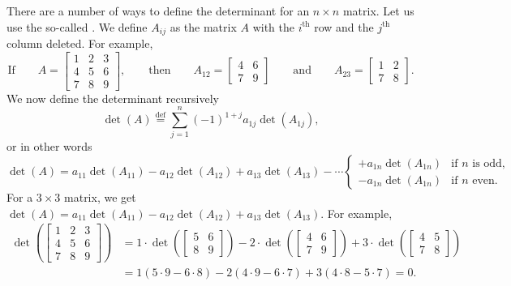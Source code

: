 There are a number of ways to define the determinant for an $n \times n$
matrix.  Let us use the so-called \emph{}.
We define $A_{ij}$ as
the matrix $A$ with the $i^{\text{th}}$ row and the $j^{\text{th}}$ column
deleted.  For example,
\begin{equation*}
\text{If} \qquad
A = 
\begin{bmatrix}
1 & 2 & 3 \\
4 & 5 & 6 \\
7 & 8 & 9
\end{bmatrix} ,
\qquad
\text{then}
\qquad
A_{12} = 
\begin{bmatrix}
4 & 6 \\
7 & 9
\end{bmatrix}
\qquad
\text{and}
\qquad
A_{23} = 
\begin{bmatrix}
1 & 2 \\
7 & 8
\end{bmatrix} .
\end{equation*}
We now define the determinant recursively
\begin{equation*}
\det (A)
\overset{\text{def}}{=}
\sum_{j=1}^n
{(-1)}^{1+j}
a_{1j} \det (A_{1j}) ,
\end{equation*}
or in other words
\begin{equation*}
\det (A) =
a_{11} \det (A_{11}) - 
a_{12} \det (A_{12}) + 
a_{13} \det (A_{13}) - 
\cdots
\begin{cases}
+ a_{1n} \det (A_{1n}) & \text{if } n \text{ is odd,} \\
- a_{1n} \det (A_{1n}) & \text{if } n \text{ even.}
\end{cases}
\end{equation*}
For a $3 \times 3$ matrix,
we get $\det (A) = a_{11} \det (A_{11}) -
a_{12} \det (A_{12}) + a_{13} \det (A_{13})$.  For example,
\begin{equation*}
\begin{split}
\det \left(
\begin{bmatrix}
1 & 2 & 3 \\
4 & 5 & 6 \\
7 & 8 & 9
\end{bmatrix}
\right)
& =
1 \cdot
\det \left(
\begin{bmatrix}
5 & 6 \\
8 & 9
\end{bmatrix}
\right)
-
2 \cdot
\det \left(
\begin{bmatrix}
4 & 6 \\
7 & 9
\end{bmatrix}
\right)
+
3 \cdot
\det \left(
\begin{bmatrix}
4 & 5 \\
7 & 8
\end{bmatrix}
\right) \\
& =
1 (5 \cdot 9 - 6 \cdot 8)
-
2 (4 \cdot 9 - 6 \cdot 7)
+
3 (4 \cdot 8 - 5 \cdot 7)
= 0 .
\end{split}
\end{equation*}

